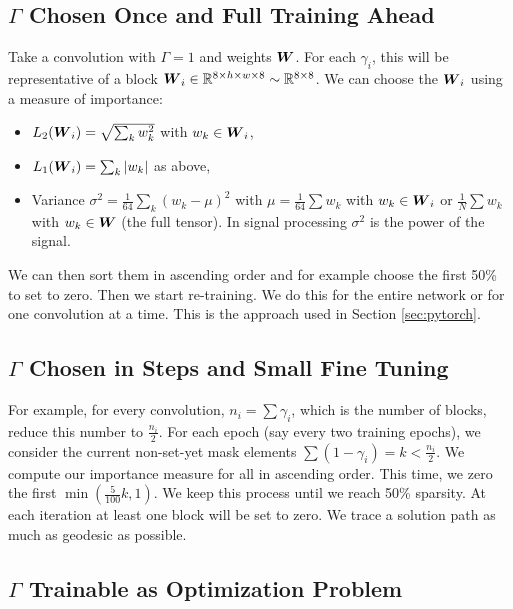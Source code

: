 \documentclass[conference]{IEEEtran}
\begin{document}
\subsection{$\Gamma$ Chosen Once and Full Training Ahead}
\label{sec:one-mask}
Take a convolution with $\Gamma = 1$ and weights ${\boldsymbol W}$. For each
$\gamma_i$, this will be representative of a block ${\boldsymbol W}_i \in \mathbb{R}^{8
  \times h \times w \times 8} \sim \mathbb{R}^{8\times 8}$. We can choose the
${\boldsymbol W}_i$ using a measure of importance:
\begin{itemize}
  \item $L_2({\boldsymbol W}_i) = \sqrt{\sum_k w_k^2}$ with $w_k \in {\boldsymbol W}_i$,
  \item $L_1({\boldsymbol W}_i) = \sum_k |w_k|$ as above,
  \item Variance $\sigma^2 = \frac{1}{64}\sum_k (w_k -\mu)^2$ with
    $\mu = \frac{1}{64}\sum w_k$ with $w_k \in {\boldsymbol W}_i$ or
    $\frac{1}{N}\sum w_k$ with $w_k \in {\boldsymbol W}$ (the full
    tensor). In signal processing $\sigma^2$ is the power of the
    signal.
\end{itemize}
We can then sort them in ascending order and for example choose the
first 50\% to set to zero. Then we start re-training. We do this for
the entire network or for one convolution at a time. This is the
approach used in Section \ref{sec:pytorch}.

\subsection{$\Gamma$ Chosen in Steps  and Small Fine Tuning}

For example, for every convolution, $n_i =\sum \gamma_i$, which is the
number of blocks, reduce this number to $\frac{n_i}{2}$. For each
epoch (say every two training epochs), we consider the current
non-set-yet mask elements $\sum (1-\gamma_i) = k < \frac{n_i}{2}$. We
compute our importance measure for all in ascending order. This time,
we zero the first $\min(\frac{5}{100}k, 1)$. We keep this process
until we reach 50\% sparsity. At each iteration at least one block
will be set to zero. We trace a solution path as much as geodesic as
possible.

\subsection{$\Gamma$ Trainable as Optimization Problem}
\end{document}
